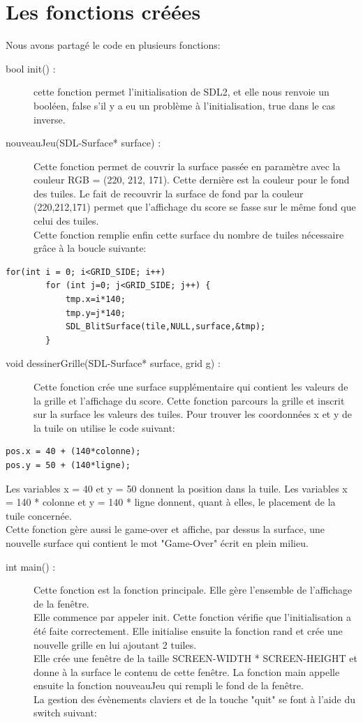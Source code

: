 \documentclass{report}
\begin{document}
\section{Les fonctions créées}
Nous avons partagé le code en plusieurs fonctions:
\begin{description}
\item[bool init() :] cette fonction permet l'initialisation de SDL2, et elle nous renvoie un booléen, false s'il y a eu un problème à l'initialisation, true dans le cas inverse.
\item[nouveauJeu(SDL-Surface* surface) :] Cette fonction permet de couvrir la surface passée en paramètre avec la couleur RGB = (220, 212, 171). Cette dernière est la couleur pour le fond des tuiles. Le fait de recouvrir la surface de fond par la couleur (220,212,171) permet que l'affichage du score se fasse sur le même fond que celui des tuiles.\\
Cette fonction remplie enfin cette surface du nombre de tuiles nécessaire grâce à la boucle suivante:
\end{description}
\begin{lstlisting}[frame=single]
for(int i = 0; i<GRID_SIDE; i++)
        for (int j=0; j<GRID_SIDE; j++) {
            tmp.x=i*140;
            tmp.y=j*140;
            SDL_BlitSurface(tile,NULL,surface,&tmp);
        }
\end{lstlisting}
\begin{description}
\item[void dessinerGrille(SDL-Surface* surface, grid g) :] Cette fonction crée une surface supplémentaire qui contient les valeurs de la grille et l'affichage du score. Cette fonction  parcours la grille et inscrit sur la surface les valeurs des tuiles. Pour trouver les coordonnées x et y de la tuile on utilise le code suivant:
\end{description}
\begin{lstlisting}[frame=single]
pos.x = 40 + (140*colonne);
pos.y = 50 + (140*ligne);
\end{lstlisting}
Les variables x = 40 et y = 50 donnent la position dans la tuile. Les variables x = 140 * colonne et y = 140 * ligne donnent, quant à elles, le placement de la tuile concernée.\\
Cette fonction gère aussi le game-over et affiche, par dessus la surface, une nouvelle surface qui contient le mot "Game-Over" écrit en plein milieu.
\begin{description}
\item[int main() :] Cette fonction est la fonction principale. Elle gère l'ensemble de l'affichage de la fenêtre.\\
Elle commence par appeler init. Cette fonction vérifie que l'initialisation a été faite correctement. Elle initialise ensuite la fonction rand et crée une nouvelle grille en lui ajoutant 2 tuiles.\\
Elle crée une fenêtre de la taille SCREEN-WIDTH * SCREEN-HEIGHT et donne à la surface le contenu de cette fenêtre. La fonction main appelle ensuite la fonction nouveauJeu qui rempli le fond de la fenêtre.\\
La gestion des évènements claviers et de la touche "quit"  se font à l'aide du switch suivant:
\end{description}
\end{document}
